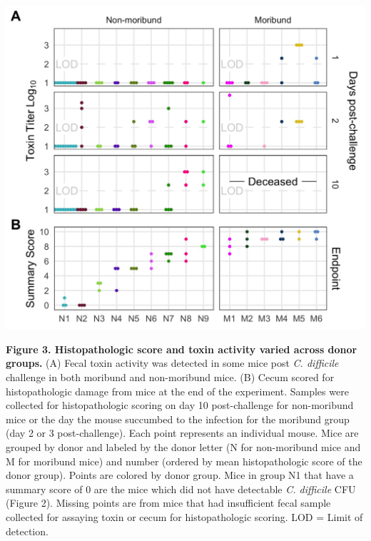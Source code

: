 \documentclass[
  12pt,
]{article}
\begin{document}
\hfill\break

\includegraphics{../results/figures/figure_3.jpg}

\textbf{Figure 3. Histopathologic score and toxin activity varied across
donor groups.} (A) Fecal toxin activity was detected in some mice post
\emph{C. difficile} challenge in both moribund and non-moribund mice.
(B) Cecum scored for histopathologic damage from mice at the end of the
experiment. Samples were collected for histopathologic scoring on day 10
post-challenge for non-moribund mice or the day the mouse succumbed to
the infection for the moribund group (day 2 or 3 post-challenge). Each
point represents an individual mouse. Mice are grouped by donor and
labeled by the donor letter (N for non-moribund mice and M for moribund
mice) and number (ordered by mean histopathologic score of the donor
group). Points are colored by donor group. Mice in group N1 that have a
summary score of 0 are the mice which did not have detectable \emph{C.
difficile} CFU (Figure 2). Missing points are from mice that had
insufficient fecal sample collected for assaying toxin or cecum for
histopathologic scoring. LOD = Limit of detection.

\hfill\break
\end{document}
